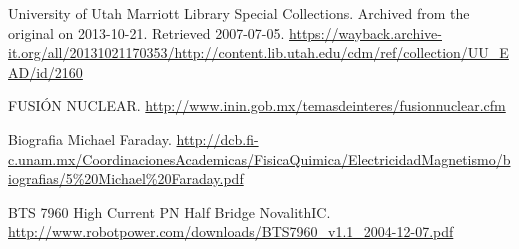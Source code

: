 \documentclass[twoside,22pt]{Latex/Classes/thesisUMSNH}
\begin{document}
\begin{thebibliography}{2}
University of Utah Marriott Library Special Collections. Archived from the original on 2013-10-21. Retrieved 2007-07-05. \url{https://wayback.archive-it.org/all/20131021170353/http://content.lib.utah.edu/cdm/ref/collection/UU_EAD/id/2160}

FUSIÓN NUCLEAR. \url{http://www.inin.gob.mx/temasdeinteres/fusionnuclear.cfm}

Biografia Michael Faraday. \url{http://dcb.fi-c.unam.mx/CoordinacionesAcademicas/FisicaQuimica/ElectricidadMagnetismo/biografias/5\%20Michael\%20Faraday.pdf}

BTS 7960 High Current PN Half Bridge NovalithIC. \url{http://www.robotpower.com/downloads/BTS7960_v1.1_2004-12-07.pdf}





\end{thebibliography}
\end{document}

